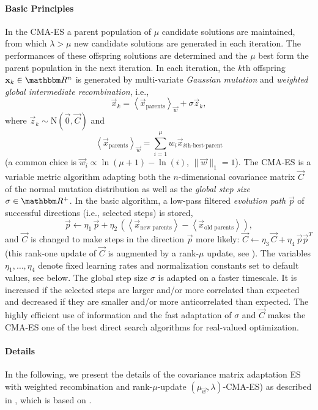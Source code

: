 \paragraph{Basic Principles}
In the CMA-ES \cite{hansen2003rtc,Hansen2006} a parent population of
$\mu$ candidate solutions are maintained, from which $\lambda>\mu$ new
candidate solutions are generated in each iteration. The performances
of these offspring solutions  are determined and the $\mu$
best form the parent population in the next iteration.  In each
iteration, the $k$th offspring $\vec{x}_k\in\mathbbm R^n$ is generated
by multi-variate \emph{Gaussian mutation} and \emph{weighted global
  intermediate recombination}, i.e.,
\[\vec{x}_k=\left<\vec{x}_{\text{parents}}\right>_{\vec w}
+\sigma\vec{z}_k,\] where $\vec{z}_k\sim \text{N}(\vec 0, \vec C)$ and
\[\left<{\vec{x}}_{\text{parents}}\right>_{\vec w} = \sum_{i=1}^\mu w_i
{\vec x}_{\text{$i$th-best-parent}}\] 
(a common chice is $\vec w_i\propto \ln(\mu+1) -
\ln(i)$, $\|\vec w\|_1=1$).
%
The CMA-ES is a variable metric algorithm adapting both the
$n$-dimensional covariance matrix $\vec C$ of the normal mutation
distribution as well as the \emph{global step size } $\sigma\in\mathbbm
R^+$. In the basic algorithm, a low-pass filtered \emph{evolution
  path} $\vec{p}$ of successful directions (i.e., selected steps) is
stored, \[\vec{p} \leftarrow \eta_1\, \vec{p} +
\eta_2\,\left(\left<{\vec{x}}_{\text{new
        parents}}\right>-\left<{\vec{x}}_{\text{old
        parents}}\right>\right),\] and $\vec{C}$ is changed to make
steps in the direction $\vec{p}$ more likely: $\vec{C} \leftarrow
\eta_3\, \vec{C}+ \eta_4\,\vec{p}\vec{p}^T$ (this rank-one update of $\vec C$ is augmented by a
rank-$\mu$ update, see \cite{hansen2003rtc}).
%
The variables $\eta_1,\dots,\eta_4$ denote fixed learning rates and
normalization constants set to default values, see below.  The global
step size $\sigma$ is adapted on a faster timescale.  It is increased
if the selected steps are larger and/or more correlated than expected
and decreased if they are smaller and/or more anticorrelated than
expected.
%
The highly efficient use of information and the fast adaptation of
$\sigma$ and $\vec C$ makes the CMA-ES one of the best direct search
algorithms for real-valued optimization. 

\paragraph{Details}
  In the following, we present the details of
the covariance matrix adaptation ES 
with weighted recombination and rank-$\mu$-update
$(\mu_{\vec w},\lambda)$-CMA-ES) as described in
\cite{hansen2003rtc,Hansen2006}, which is based on 
\cite{Hansen:96,hansen:01}. 

